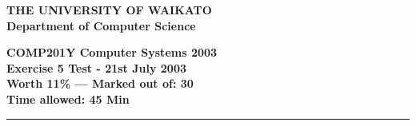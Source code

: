 \documentclass[a4paper,10pt]{article}
\begin{document}
\newcommand{\marks}[1]
{\begin{flushright}{\bf (#1 marks)}\end{flushright}}

{\centering \large \bf THE UNIVERSITY OF WAIKATO\\}
{\centering \large \bf Department of Computer Science\\[0.5cm]}

{\centering \large \bf COMP201Y Computer Systems 2003\\}
{\centering \large \bf Exercise 5 Test - 21st July 2003\\[0.3cm]}
{\centering \bf Worth 11\% --- Marked out of: 30\\[0.3cm]}
{\centering \bf Time allowed: 45 Min\\[1cm]}
\hrule
\end{document}
